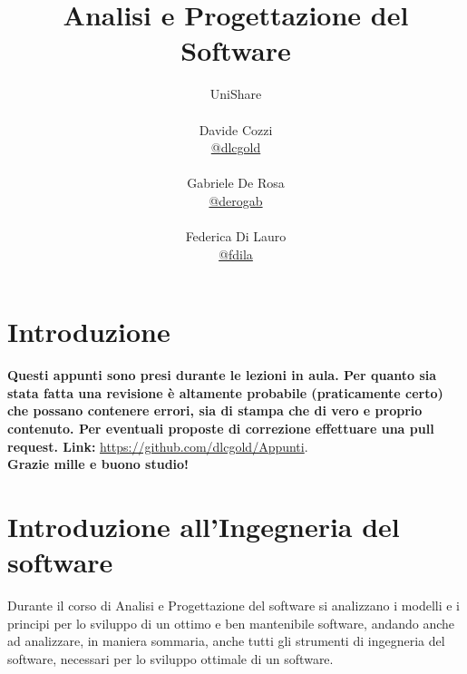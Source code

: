 \documentclass[a4paper,12pt, oneside]{book}
\title{Analisi e Progettazione del Software}
\author{UniShare\\\\Davide Cozzi\\\href{https://t.me/dlcgold}{@dlcgold}\\\\Gabriele De Rosa\\\href{https://t.me/derogab}{@derogab} \\\\Federica Di Lauro\\\href{https://t.me/f_dila}{@f\textunderscore dila}}
\date{}
\begin{document}
\maketitle


\newtheorem{teorema}{Teorema}
\newtheorem{definizione}{Definizione}
\newtheorem{esempio}{Esempio}
\newtheorem{corollario}{Corollario}
\newtheorem{lemma}{Lemma}
\newtheorem{osservazione}{Osservazione}
\newtheorem{nota}{Nota}
\newtheorem{esercizio}{Esercizio}
\tableofcontents
\renewcommand{\chaptermark}[1]{%
\markboth{\chaptername
\ \thechapter.\ #1}{}}
\renewcommand{\sectionmark}[1]{\markright{\thesection.\ #1}}
\chapter{Introduzione}
\textbf{Questi appunti sono presi durante le lezioni in aula. Per quanto sia stata fatta una revisione è altamente probabile (praticamente certo) che possano contenere errori, sia di stampa che di vero e proprio contenuto. Per eventuali proposte di correzione effettuare una pull request. Link: } \url{https://github.com/dlcgold/Appunti}.\\
\textbf{Grazie mille e buono studio!}
\chapter{Introduzione all'Ingegneria del software}
Durante il corso di Analisi e Progettazione del software si analizzano i modelli e i principi per lo sviluppo di un 
ottimo e ben mantenibile software, andando anche ad analizzare, in maniera sommaria, anche tutti gli strumenti di 
ingegneria del software, necessari per lo sviluppo ottimale di un software.
\end{document}
